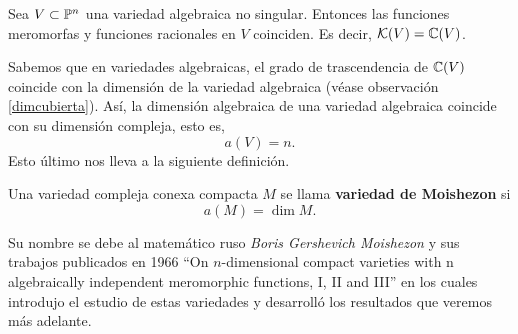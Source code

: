 \begin{theorem}\parencite[Chap. VIII, Sec. 3.1, Theo. 1]{shafarevich2016basic}
	Sea $V\subset \mathbb{P}^n$ una variedad algebraica no singular. Entonces las funciones meromorfas y funciones racionales en $V$ coinciden. Es decir, $\mathcal{K}(V)=\mathbb{C}(V)$.
\end{theorem}

Sabemos que en variedades algebraicas, el grado de trascendencia de $\mathbb{C}(V)$ coincide con la dimensión de la variedad algebraica (véase observación \ref{dimcubierta}). Así, la dimensión algebraica de una variedad algebraica coincide con su dimensión compleja, esto es,
\begin{equation*}
	a(V)=n.
\end{equation*}
Esto último nos lleva a la siguiente definición.

\begin{definition}
	Una variedad compleja conexa compacta $M$ se llama \textbf{variedad de Moishezon} si
	\begin{equation*}
		a(M)=\dim M.
	\end{equation*}
\end{definition}

Su nombre se debe al matemático ruso \textit{Boris Gershevich Moishezon} y sus trabajos publicados en 1966 \enquote{On $n$-dimensional compact varieties with n algebraically independent meromorphic functions, I, II and III} en los cuales introdujo el estudio de estas variedades y desarrolló los resultados que veremos más adelante.

